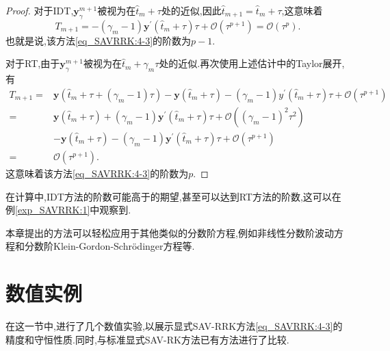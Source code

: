 \begin{proof}
对于IDT,$\bm{y}_\gamma^{m+1}$被视为在$\hat{t}_m+\tau$处的近似,因此$\hat{t}_{m+1}=\hat{t}_m+\tau$,这意味着
$$T_{m+1}=-\left(\gamma_m-1\right) \bm{y}^{\prime}\left(\hat{t}_m+\tau\right) \tau+\mathcal{O}\left(\tau^{p+1}\right)=\mathcal{O}\left(\tau^p\right).$$
也就是说,该方法\eqref{eq_SAVRRK:4-3}的阶数为$p-1$.

对于RT,由于$\bm{y}_\gamma^{m+1}$被视为在$\hat{t}_m+\gamma_m \tau$处的近似.再次使用上述估计中的Taylor展开,有
\begin{align}
T_{m+1}\!= & \bm{y}\left(\hat{t}_m\!+\!\tau\!+\!\left(\gamma_m\!-\!1\right) \tau\right)\!-\!\bm{y}\left(\hat{t}_m\!+\!\tau\right)\!-\!\left(\gamma_m\!-\!1\right) y^{\prime}\left(\hat{t}_m\!+\!\tau\right) \tau\!+\!\mathcal{O}(\tau^{p+1}) \nonumber\\
\!= & \bm{y}\left(\hat{t}_m\!+\!\tau\right)\!+\!\left(\gamma_m\!-\!1\right) \bm{y}^{\prime}\left(\hat{t}_m\!+\!\tau\right) \tau\!+\!\mathcal{O}(\left(\gamma_m\!-\!1\right)^2 \tau^2)\!\nonumber\\
&-\!\bm{y}\left(\hat{t}_m\!+\!\tau\right)\!-\!\left(\gamma_m\!-\!1\right) \bm{y}^{\prime}\left(\hat{t}_m\!+\!\tau\right) \tau\!+\!\mathcal{O}(\tau^{p+1}) \nonumber\\
\!= & \mathcal{O}(\tau^{p+1}).
\end{align}
这意味着该方法\eqref{eq_SAVRRK:4-3}的阶数为$p$.
\end{proof}

\begin{remark}\label{rk_SAVRRK:5_5}
在计算中,IDT方法的阶数可能高于的期望,甚至可以达到RT方法的阶数,这可以在例\ref{exp_SAVRRK:1}中观察到.
\end{remark}
	
\begin{remark}\label{rk_SAVRRK:5_6}
本章提出的方法可以轻松应用于其他类似的分数阶方程,例如非线性分数阶波动方程和分数阶Klein-Gordon-Schr{\"o}dinger方程等.
\end{remark}

\section{数值实例}\label{Section_SAVRRK: 6}

在这一节中,进行了几个数值实验,以展示显式SAV-RRK方法\eqref{eq_SAVRRK:4-3}的精度和守恒性质.同时,与标准显式SAV-RK方法已有方法进行了比较.

